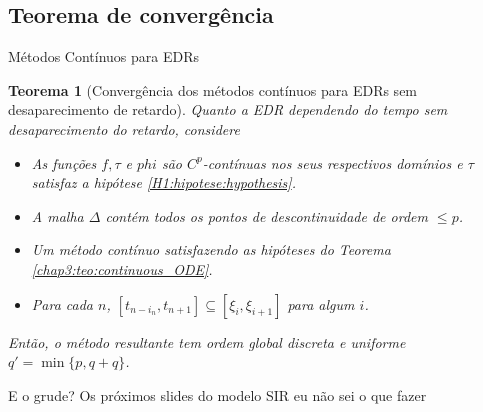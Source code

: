 \documentclass{beamer}
\theoremstyle{plain}
\newtheorem{teo}{Teorema}
\theoremstyle{definition}
\begin{document}

\subsection{Teorema de convergência}

\begin{frame}{Métodos Contínuos para EDRs}
    \footnotesize
\begin{teo}[Convergência dos métodos contínuos para EDRs sem desaparecimento de retardo]
  \label{chap3:teo:DDE_method_1}
  Quanto a EDR dependendo do tempo sem desaparecimento do retardo, considere

  \begin{itemize}
      \item[$\bullet$] As funções $f, \tau$ e $phi$ são $C^p$-contínuas nos seus respectivos domínios e $\tau$ satisfaz a hipótese \ref{H1:hipotese:hypothesis}.

      \item[$\bullet$] A malha $\Delta$ contém todos os pontos de descontinuidade de ordem $\leq p$.

      \item[$\bullet$] Um método contínuo satisfazendo as hipóteses do Teorema \ref{chap3:teo:continuous_ODE}.

      \item[$\bullet$] Para cada $n$, $\left[t_{n-i_{n}}, t_{n+1}\right] \subseteq \left[\xi_{i}, \xi_{i+1}\right]$ para algum $i$.

  \end{itemize}

  Então, o método resultante tem ordem global discreta e uniforme $q' = \min\{p, q+q\}$.


\end{teo}
\end{frame}


\begin{frame}{E o grude?}
    Os próximos slides do modelo SIR eu não sei o que fazer
\end{frame}

\end{document}
